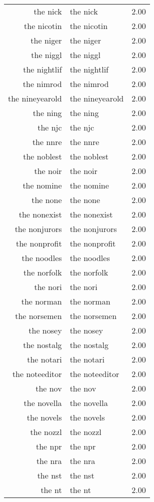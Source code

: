 \begin{table}[ht]
\begin{tabular}{rlr}
  the nick & the nick & 2.00 \\ 
  the nicotin & the nicotin & 2.00 \\ 
  the niger & the niger & 2.00 \\ 
  the niggl & the niggl & 2.00 \\ 
  the nightlif & the nightlif & 2.00 \\ 
  the nimrod & the nimrod & 2.00 \\ 
  the nineyearold & the nineyearold & 2.00 \\ 
  the ning & the ning & 2.00 \\ 
  the njc & the njc & 2.00 \\ 
  the nnre & the nnre & 2.00 \\ 
  the noblest & the noblest & 2.00 \\ 
  the noir & the noir & 2.00 \\ 
  the nomine & the nomine & 2.00 \\ 
  the none & the none & 2.00 \\ 
  the nonexist & the nonexist & 2.00 \\ 
  the nonjurors & the nonjurors & 2.00 \\ 
  the nonprofit & the nonprofit & 2.00 \\ 
  the noodles & the noodles & 2.00 \\ 
  the norfolk & the norfolk & 2.00 \\ 
  the nori & the nori & 2.00 \\ 
  the norman & the norman & 2.00 \\ 
  the norsemen & the norsemen & 2.00 \\ 
  the nosey & the nosey & 2.00 \\ 
  the nostalg & the nostalg & 2.00 \\ 
  the notari & the notari & 2.00 \\ 
  the noteeditor & the noteeditor & 2.00 \\ 
  the nov & the nov & 2.00 \\ 
  the novella & the novella & 2.00 \\ 
  the novels & the novels & 2.00 \\ 
  the nozzl & the nozzl & 2.00 \\ 
  the npr & the npr & 2.00 \\ 
  the nra & the nra & 2.00 \\ 
  the nst & the nst & 2.00 \\ 
  the nt & the nt & 2.00 \\ 

\end{tabular}
\end{table}
